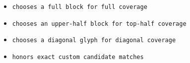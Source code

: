 \begin{itemize}
\tightlist
\item
  \texttt{c\allowbreak{}h\allowbreak{}o\allowbreak{}o\allowbreak{}s\allowbreak{}e\allowbreak{}s\allowbreak{} \allowbreak{}a\allowbreak{} \allowbreak{}f\allowbreak{}u\allowbreak{}l\allowbreak{}l\allowbreak{} \allowbreak{}b\allowbreak{}l\allowbreak{}o\allowbreak{}c\allowbreak{}k\allowbreak{} \allowbreak{}f\allowbreak{}o\allowbreak{}r\allowbreak{} \allowbreak{}f\allowbreak{}u\allowbreak{}l\allowbreak{}l\allowbreak{} \allowbreak{}c\allowbreak{}o\allowbreak{}v\allowbreak{}e\allowbreak{}r\allowbreak{}a\allowbreak{}g\allowbreak{}e}
\item
  \texttt{c\allowbreak{}h\allowbreak{}o\allowbreak{}o\allowbreak{}s\allowbreak{}e\allowbreak{}s\allowbreak{} \allowbreak{}a\allowbreak{}n\allowbreak{} \allowbreak{}u\allowbreak{}p\allowbreak{}p\allowbreak{}e\allowbreak{}r\allowbreak{}-\allowbreak{}h\allowbreak{}a\allowbreak{}l\allowbreak{}f\allowbreak{} \allowbreak{}b\allowbreak{}l\allowbreak{}o\allowbreak{}c\allowbreak{}k\allowbreak{} \allowbreak{}f\allowbreak{}o\allowbreak{}r\allowbreak{} \allowbreak{}t\allowbreak{}o\allowbreak{}p\allowbreak{}-\allowbreak{}h\allowbreak{}a\allowbreak{}l\allowbreak{}f\allowbreak{} \allowbreak{}c\allowbreak{}o\allowbreak{}v\allowbreak{}e\allowbreak{}r\allowbreak{}a\allowbreak{}g\allowbreak{}e}
\item
  \texttt{c\allowbreak{}h\allowbreak{}o\allowbreak{}o\allowbreak{}s\allowbreak{}e\allowbreak{}s\allowbreak{} \allowbreak{}a\allowbreak{} \allowbreak{}d\allowbreak{}i\allowbreak{}a\allowbreak{}g\allowbreak{}o\allowbreak{}n\allowbreak{}a\allowbreak{}l\allowbreak{} \allowbreak{}g\allowbreak{}l\allowbreak{}y\allowbreak{}p\allowbreak{}h\allowbreak{} \allowbreak{}f\allowbreak{}o\allowbreak{}r\allowbreak{} \allowbreak{}d\allowbreak{}i\allowbreak{}a\allowbreak{}g\allowbreak{}o\allowbreak{}n\allowbreak{}a\allowbreak{}l\allowbreak{} \allowbreak{}c\allowbreak{}o\allowbreak{}v\allowbreak{}e\allowbreak{}r\allowbreak{}a\allowbreak{}g\allowbreak{}e}
\item
  \texttt{h\allowbreak{}o\allowbreak{}n\allowbreak{}o\allowbreak{}r\allowbreak{}s\allowbreak{} \allowbreak{}e\allowbreak{}x\allowbreak{}a\allowbreak{}c\allowbreak{}t\allowbreak{} \allowbreak{}c\allowbreak{}u\allowbreak{}s\allowbreak{}t\allowbreak{}o\allowbreak{}m\allowbreak{} \allowbreak{}c\allowbreak{}a\allowbreak{}n\allowbreak{}d\allowbreak{}i\allowbreak{}d\allowbreak{}a\allowbreak{}t\allowbreak{}e\allowbreak{} \allowbreak{}m\allowbreak{}a\allowbreak{}t\allowbreak{}c\allowbreak{}h\allowbreak{}e\allowbreak{}s}

\end{itemize}
